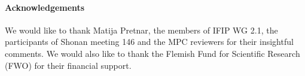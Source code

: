 \documentclass{llncs}
\begin{document}
%
%



\paragraph{Acknowledgements}
We would like to thank Matija Pretnar, the members of IFIP WG 2.1, the
participants of Shonan meeting 146 and the MPC reviewers for their insightful
comments. We would also like to thank the Flemish Fund for Scientific Research (FWO) for their financial support.




%
\end{document}
